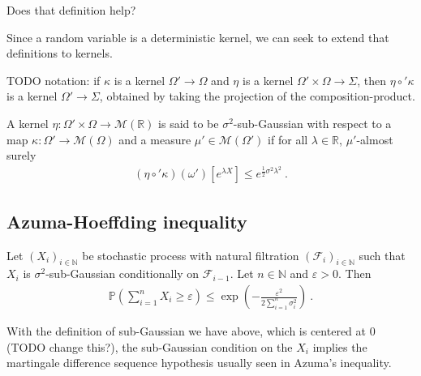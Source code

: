 Does that definition help?

Since a random variable is a deterministic kernel, we can seek to extend that definitions to kernels.

TODO notation: if $\kappa$ is a kernel $\Omega' \to \Omega$ and $\eta$ is a kernel $\Omega' \times \Omega \to \Sigma$, then $\eta \circ' \kappa$ is a kernel $\Omega' \to \Sigma$, obtained by taking the projection of the composition-product.

\begin{definition}
A kernel $\eta : \Omega' \times \Omega \to \mathcal M(\mathbb{R})$ is said to be $\sigma^2$-sub-Gaussian with respect to a map $\kappa : \Omega' \to \mathcal M(\Omega)$ and a measure $\mu' \in \mathcal M(\Omega')$ if for all $\lambda \in \mathbb{R}$, $\mu'$-almost surely
\begin{align*}
(\eta \circ' \kappa)(\omega')[e^{\lambda X}] \le e^{\frac{1}{2}\sigma^2\lambda^2} \: .
\end{align*}
\end{definition}

\subsection{Azuma-Hoeffding inequality}
\label{sub:azuma_hoeffding_inequality}

\begin{theorem}
Let $(X_i)_{i\in \mathbb{N}}$ be stochastic process with natural filtration $(\mathcal F_i)_{i\in \mathbb{N}}$ such that $X_i$ is $\sigma^2$-sub-Gaussian conditionally on $\mathcal F_{i-1}$. Let $n \in \mathbb{N}$ and $\varepsilon > 0$. Then
\begin{align*}
\mathbb{P}(\sum_{i=1}^n X_i \ge \varepsilon) \le \exp \left( - \frac{\varepsilon^2}{2 \sum_{i=1}^n \sigma_i^2} \right) \: .
\end{align*}
\end{theorem}

With the definition of sub-Gaussian we have above, which is centered at 0 (TODO change this?), the sub-Gaussian condition on the $X_i$ implies the martingale difference sequence hypothesis usually seen in Azuma's inequality.

